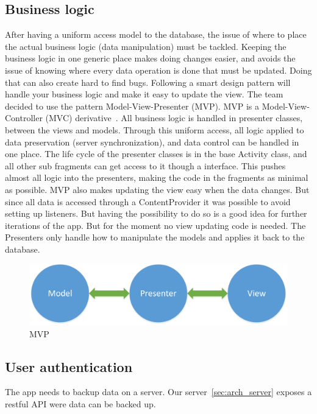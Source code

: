 \subsection{Business logic}
After having a uniform access model to the database, the issue of where to place the actual business logic (data manipulation) must be tackled. Keeping the business logic in one generic place makes doing changes easier, and avoids the issue of knowing where every data operation is done that must be updated. Doing that can also create hard to find bugs. Following a smart design pattern will handle your business logic and make it easy to update the view. 
The team decided to use the pattern Model-View-Presenter (MVP). MVP is a Model-View-Controller (MVC) derivative~\cite{mvc}. All business logic is handled in presenter classes, between the views and models. Through this uniform access, all logic applied to data preservation (server synchronization), and data control can be handled in one place. The life cycle of the presenter classes is in the base Activity class, and all other sub fragments can get access to it though a interface. 
This pushes almost all logic into the presenters, making the code in the fragments as minimal as possible. 
MVP also makes updating the view easy when the data changes. But since all data is accessed through a ContentProvider it was possible to avoid setting up listeners. But having the possibility to do so is a good idea for further iterations of the app. But for the moment no view updating code is needed. The Presenters only handle how to manipulate the models and applies it back to the database.

\begin{figure}[H]
\includegraphics[width=\textwidth]{ch/architecture/fig/mvp.png}
\caption{MVP}
\label{fig:mvp}
\end{figure}

\subsection{User authentication}
The app needs to backup data on a server. Our server~\ref{sec:arch_server} exposes a restful API were data can be backed up.

